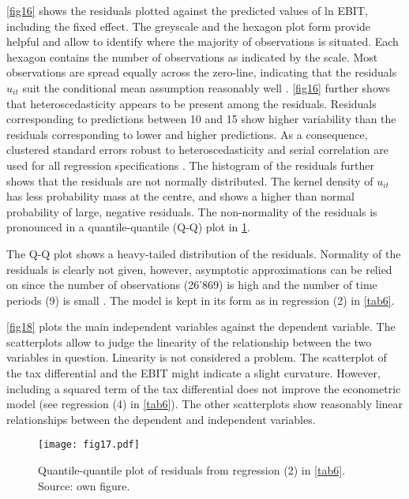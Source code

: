 \documentclass[10pt,twocolumn,oneside,cmyk]{article}
\begin{document}
\cref{fig16} shows the residuals plotted against the predicted values of ln EBIT, including the fixed effect. The greyscale and the hexagon plot form provide helpful and allow to identify where the majority of observations is situated. Each hexagon contains the number of observations as indicated by the scale. Most observations are spread equally across the zero-line, indicating that the residuals $u_{it}$ suit the conditional mean assumption reasonably well \parencite[164]{stock_introduction_2012}. \cref{fig16} further shows that heteroscedasticity appears to be present among the residuals. Residuals corresponding to predictions between 10 and 15 show higher variability than the residuals corresponding to lower and higher predictions. As a consequence, clustered standard errors robust to heteroscedasticity and serial correlation are used for all regression specifications \parencites[404]{stock_introduction_2012}[285]{hoechle_robust_2007}. The histogram of the residuals further shows that the residuals are not normally distributed. The kernel density of $u_{it}$ has less probability mass at the centre, and shows a higher than normal probability of large, negative residuals. The non-normality of the residuals is pronounced in a quantile-quantile (Q-Q) plot in \cref{fig17}.

The Q-Q plot shows a heavy-tailed distribution of the residuals. Normality of the residuals is clearly not given, however, asymptotic approximations can be relied on since the number of observations (26'869) is high and the number of time periods (9) is small \parencite[504]{wooldridge_introductory_2009}. The model is kept in its form as in regression (2) in \cref{tab6}.

\cref{fig18} plots the main independent variables against the dependent variable. The scatterplots allow to judge the linearity of the relationship between the two variables in question. Linearity is not considered a problem. The scatterplot of the tax differential and the EBIT might indicate a slight curvature. However, including a squared term of the tax differential does not improve the econometric model (see regression (4) in \cref{tab6}). The other scatterplots show reasonably linear relationships between the dependent and independent variables.

\begin{figure}[!]
 \centering \captionsetup{width=0.95\linewidth}
   \texttt{[image: fig17.pdf]} 
 \caption[Quantile-quantile plot of residuals from regression (2) in \cref{tab6}]{Quantile-quantile plot of residuals from regression (2) in \cref{tab6}. Source: own figure.} \label{fig17}
\end{figure}
\end{document}

